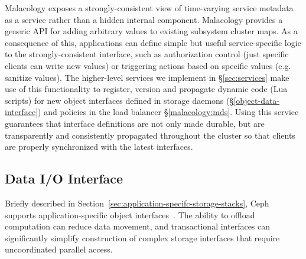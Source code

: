  Malacology exposes a strongly-consistent
view of time-varying service metadata as a service rather than a hidden
internal component. Malacology provides a generic API for adding arbitrary
values to existing subsystem cluster maps. As a consequence of this,
applications can define simple but useful service-specific logic to the
strongly-consistent interface, such as authorization control (just specific
clients can write new values) or triggering actions based on specific values
(e.g. sanitize values).  The higher-level services we implement in
\S\ref{sec:services} make use of this functionality to register, version and
propagate dynamic code (Lua scripts) for new object interfaces defined in
storage daemons (\S\ref{object-data-interface}) and policies in the load
balancer \S\ref{malacology:mds}.  Using this service guarantees that interface
definitions are not only made durable, but are transparently and consistently
propagated throughout the cluster so that clients are properly synchronized
with the latest interfaces.\\

\noindent{} 


\subsection{Data I/O Interface}
\label{sec:data-io-interface}
\label{object-data-interface}

Briefly described in Section~\ref{sec:application-specifc-storage-stacks}, Ceph
supports application-specific object interfaces~\cite{weil_rados_2007}. The
ability to offload computation can reduce data movement, and transactional
interfaces can significantly simplify construction of complex storage
interfaces that require uncoordinated parallel access.

